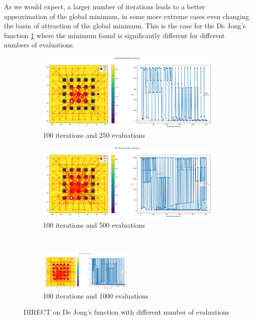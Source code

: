 As we would expect, a larger number of iterations leads to a better approximation of the global minimum, in some more extreme cases even changing the basin of attraction of the global minimum. This is the case for the De Jong's function \ref{fig:dejong-iterations} where the minimum found is significantly different for different numbers of evaluations.
\begin{figure}[H]
    \begin{subfigure}{0.5\textwidth}
        \includegraphics[width=\textwidth]{lab2/imgs/di_i100_e250.png}
        \caption{100 iterations and 250 evaluations}
    \end{subfigure}
    \begin{subfigure}{0.5\textwidth}
        \includegraphics[width=\textwidth]{lab2/imgs/di_i100_e500.png}
        \caption{100 iterations and 500 evaluations}
    \end{subfigure}\\
    \begin{subfigure}{\textwidth}
        \centering
        \includegraphics[width=0.5\textwidth]{lab2/imgs/di_i100_e1000.png}
        \caption{100 iterations and 1000 evaluations}
    \end{subfigure}
    \caption{DIRECT on De Jong's function with different number of evaluations}
    \label{fig:dejong-iterations}
\end{figure}

